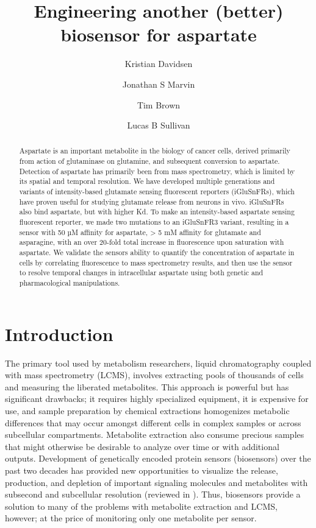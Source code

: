 \documentclass[9pt,lineno]{elife}
\title{Engineering another (better) biosensor for aspartate}
\author[1,2,\authfn{1}]{Kristian Davidsen}
\author[3,\authfn{1}*]{Jonathan S Marvin}
\author[3]{Tim Brown}
\author[1*]{Lucas B Sullivan}
\affil[1]{Human Biology Division, Fred Hutchinson Cancer Center, Seattle, WA, USA}
\affil[2]{Molecular and cellular biology program, University of Washington, Seattle, WA, USA}
\affil[3]{Howard Hughes Medical Institute (HHMI), Janelia Farm Research Campus, Ashburn, VA, USA}
\begin{document}
\maketitle

\begin{abstract}
Aspartate is an important metabolite in the biology of cancer cells, derived primarily from action of glutaminase on glutamine, and subsequent conversion to aspartate.
Detection of aspartate has primarily been from mass spectrometry, which is limited by its spatial and temporal resolution.
We have developed multiple generations and variants of intensity-based glutamate sensing fluorescent reporters (iGluSnFRs), which have proven useful for studying glutamate release from neurons in vivo. iGluSnFRs also bind aspartate, but with higher Kd.
To make an intensity-based aspartate sensing fluorescent reporter, we made two mutations to an iGluSnFR3 variant, resulting in a sensor with 50 µM affinity for aspartate, > 5 mM affinity for glutamate and asparagine, with an over 20-fold total increase in fluorescence upon saturation with aspartate.
We validate the sensors ability to quantify the concentration of aspartate in cells by correlating fluorescence to mass spectrometry results, and then use the sensor to resolve temporal changes in intracellular aspartate using both genetic and pharmacological manipulations.
\end{abstract}


\section{Introduction}
The primary tool used by metabolism researchers, liquid chromatography coupled with mass spectrometry (LCMS), involves extracting pools of thousands of cells and measuring the liberated metabolites.
This approach is powerful but has significant drawbacks; it requires highly specialized equipment, it is expensive for use, and sample preparation by chemical extractions homogenizes metabolic differences that may occur amongst different cells in complex samples or across subcellular compartments.
Metabolite extraction also consume precious samples that might otherwise be desirable to analyze over time or with additional outputs.
Development of genetically encoded protein sensors (biosensors) over the past two decades has provided new opportunities to visualize the release, production, and depletion of important signaling molecules and metabolites with subsecond and subcellular resolution (reviewed in \cite{Kostyuk2019-qc, Koveal2020-cl}).
Thus, biosensors provide a solution to many of the problems with metabolite extraction and LCMS, however; at the price of monitoring only one metabolite per sensor.
\end{document}

